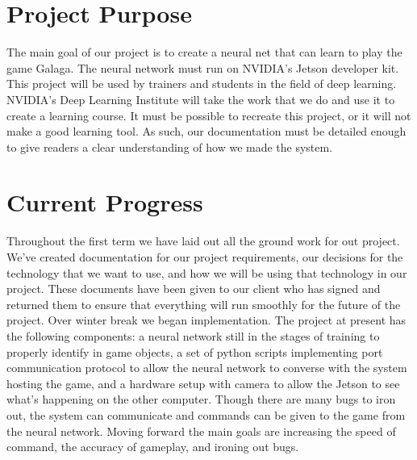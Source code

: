 \documentclass[onecolumn, draftclsnofoot,10pt, compsoc]{IEEEtran}
\begin{document}
\newpage
{}
\tableofcontents

\section{Project Purpose}
The main goal of our project is to create a neural net that can learn to play the game Galaga.
The neural network must run on NVIDIA's Jetson developer kit.
This project will be used by trainers and students in the field of deep learning.
NVIDIA's Deep Learning Institute will take the work that we do and use it to create a learning course.
It must be possible to recreate this project, or it will not make a good learning tool.
As such, our documentation must be detailed enough to give readers a clear understanding of how we made the system.

\section{Current Progress}
Throughout the first term we have laid out all the ground work for out project.
We've created documentation for our project requirements, our decisions for the technology that we want to use, and how we will be using that technology in our project.
These documents have been given to our client who has signed and returned them to ensure that everything will run smoothly for the future of the project.
\newline\newline
Over winter break we began implementation. 
The project at present has the following components: a neural network still in the stages of training to properly identify in game objects, a set of python scripts implementing port communication protocol to allow the neural network to converse with the system hosting the game, and a hardware setup with camera to allow the Jetson to see what's happening on the other computer.
Though there are many bugs to iron out, the system can communicate and commands can be given to the game from the neural network. 
Moving forward the main goals are increasing the speed of command, the accuracy of gameplay, and ironing out bugs.
\end{document}

